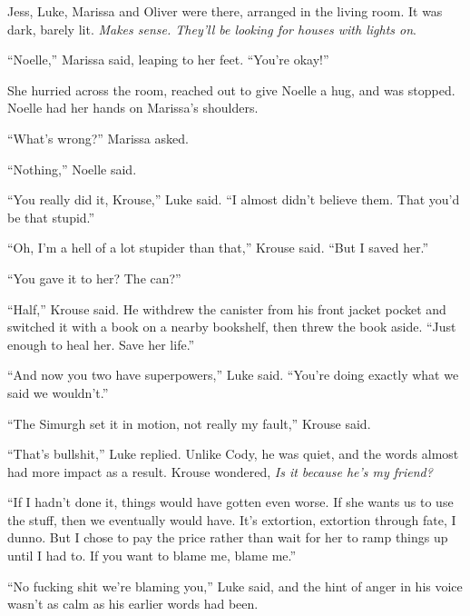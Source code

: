 Jess, Luke, Marissa and Oliver were there, arranged in the living room.  It was dark, barely lit.  \emph{Makes sense.  They'll be looking for houses with lights on}.



``Noelle,'' Marissa said, leaping to her feet.  ``You're okay!''



She hurried across the room, reached out to give Noelle a hug, and was stopped.  Noelle had her hands on Marissa's shoulders.



``What's wrong?'' Marissa asked.



``Nothing,'' Noelle said.



``You really did it, Krouse,'' Luke said.  ``I almost didn't believe them.  That you'd be that stupid.''



``Oh, I'm a hell of a lot stupider than that,'' Krouse said.  ``But I saved her.''



``You gave it to her?  The can?''



``Half,'' Krouse said.  He withdrew the canister from his front jacket pocket and switched it with a book on a nearby bookshelf, then threw the book aside.  ``Just enough to heal her.  Save her life.''



``And now you two have superpowers,'' Luke said.  ``You're doing exactly what we said we wouldn't.''



``The Simurgh set it in motion, not really my fault,'' Krouse said.



``That's bullshit,'' Luke replied.  Unlike Cody, he was quiet, and the words almost had more impact as a result.  Krouse wondered, \emph{Is it because he's my friend?  }



``If I hadn't done it, things would have gotten even worse.  If she wants us to use the stuff, then we eventually would have.  It's extortion, extortion through fate, I dunno.  But I chose to pay the price rather than wait for her to ramp things up until I had to.  If you want to blame me, blame me.''



``No fucking shit we're blaming you,'' Luke said, and the hint of anger in his voice wasn't as calm as his earlier words had been.



